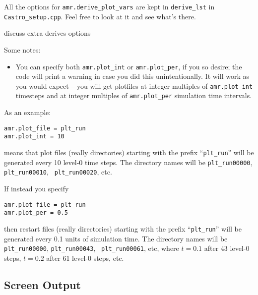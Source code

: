 All the options for {\tt amr.derive\_plot\_vars} are kept in
\texttt{derive\_lst} in {\tt Castro\_setup.cpp}.  Feel free to look at
it and see what's there.

{\color{red} discuss extra derives options}

Some notes:
\begin{itemize}

\item You can specify both {\tt amr.plot\_int} or {\tt amr.plot\_per},
  if you so desire; the code will print a warning in case you did this
  unintentionally. It will work as you would expect -- you will get plotfiles
  at integer multiples of {\tt amr.plot\_int} timesteps and at integer
  multiples of {\tt amr.plot\_per} simulation time intervals.

\end{itemize}


As an example:
\begin{lstlisting}
amr.plot_file = plt_run
amr.plot_int = 10
\end{lstlisting}
means that plot files (really directories) starting with the prefix
``{\tt plt\_run}'' will be generated every 10 level-0 time steps.  The
directory names will be {\tt plt\_run00000}, {\tt plt\_run00010}, {\tt
  plt\_run00020}, etc.


If instead you specify
\begin{lstlisting}
amr.plot_file = plt_run
amr.plot_per = 0.5
\end{lstlisting}
then restart files (really directories) starting with the prefix
``{\tt plt\_run}'' will be generated every 0.1 units of simulation time.  The
directory names will be {\tt plt\_run00000}, {\tt plt\_run00043}, {\tt
  plt\_run00061}, etc, where $t = 0.1$ after 43 level-0 steps, $t =
0.2$ after 61 level-0 steps, etc.



\subsection{Screen Output}

